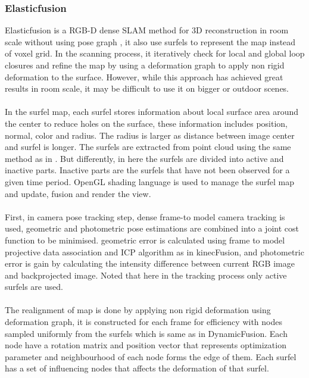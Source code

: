\documentclass[12pt,twoside]{article}
\begin{document}
\subsubsection{Elasticfusion}
Elasticfusion\cite{whelan2016elasticfusion} is a RGB-D dense SLAM method for 3D reconstruction in room scale without using pose graph , it also use surfels to represent the map instead of voxel grid. In the scanning process, it iteratively check for local and global loop closures and refine the map by using a deformation graph to apply non rigid deformation to the surface. However, while this approach has achieved great results in room scale, it may be difficult to use it on bigger or outdoor scenes.\\
\\
In the surfel map, each surfel stores information about local surface area around the center to reduce holes on the surface, these information includes position, normal, color and radius. The radius is larger as distance between image center and surfel is longer. The surfels are extracted from point cloud using the same method as in \citep{keller2013real}. But differently, in here the surfels are divided into active and inactive parts. Inactive parts are the surfels that have not been observed for a given time period. OpenGL shading language is used to manage the surfel map and update, fusion and render the view. \\
\\
First, in camera pose tracking step, dense frame-to model camera tracking is used, geometric and photometric pose estimations are combined into a joint cost function to be minimised. geometric error is calculated using frame to model projective data association and ICP algorithm as in kinecFusion\citep{newcombe2011kinectfusion}, and photometric error is gain by calculating the intensity difference between current RGB image and backprojected image. Noted that here in the tracking process only active surfels are used.\\
\\
The realignment of map is done by applying non rigid deformation using deformation graph, it is constructed for each frame for efficiency with nodes sampled uniformly from the surfels which is same as in DynamicFusion\citep{newcombe2015dynamicfusion}. Each node have a rotation matrix and position vector that represents optimization parameter and neighbourhood of each node forms the edge of them. Each surfel has a set of influencing nodes that affects the deformation of that surfel.\\
\end{document}
